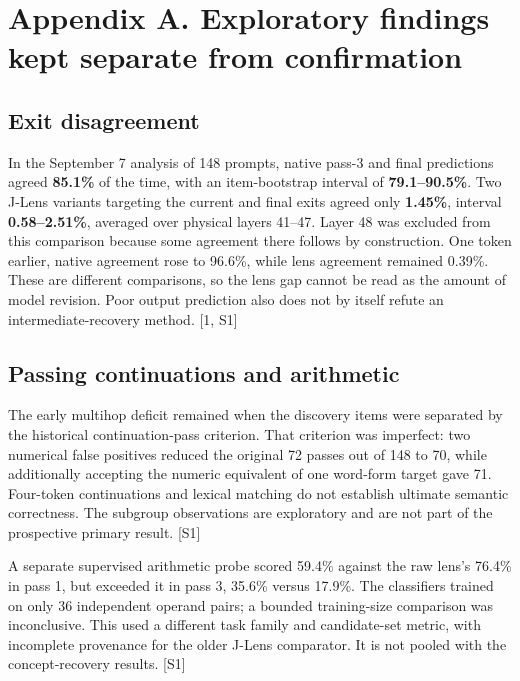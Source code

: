 \documentclass[
  11pt,
  a4paper,
]{article}
\begin{document}
\newpage

\section{Appendix A. Exploratory findings kept separate from
confirmation}\label{appendix-a.-exploratory-findings-kept-separate-from-confirmation}

\subsection{Exit disagreement}\label{exit-disagreement}

In the September 7 analysis of 148 prompts, native pass-3 and final
predictions agreed \textbf{85.1\%} of the time, with an item-bootstrap
interval of \textbf{79.1--90.5\%}. Two J-Lens variants targeting the
current and final exits agreed only \textbf{1.45\%}, interval
\textbf{0.58--2.51\%}, averaged over physical layers 41--47. Layer 48
was excluded from this comparison because some agreement there follows
by construction. One token earlier, native agreement rose to 96.6\%,
while lens agreement remained 0.39\%. These are different comparisons,
so the lens gap cannot be read as the amount of model revision. Poor
output prediction also does not by itself refute an
intermediate-recovery method. {[}1, S1{]}

\subsection{Passing continuations and
arithmetic}\label{passing-continuations-and-arithmetic}

The early multihop deficit remained when the discovery items were
separated by the historical continuation-pass criterion. That criterion
was imperfect: two numerical false positives reduced the original 72
passes out of 148 to 70, while additionally accepting the numeric
equivalent of one word-form target gave 71. Four-token continuations and
lexical matching do not establish ultimate semantic correctness. The
subgroup observations are exploratory and are not part of the
prospective primary result. {[}S1{]}

A separate supervised arithmetic probe scored 59.4\% against the raw
lens's 76.4\% in pass 1, but exceeded it in pass 3, 35.6\% versus
17.9\%. The classifiers trained on only 36 independent operand pairs; a
bounded training-size comparison was inconclusive. This used a different
task family and candidate-set metric, with incomplete provenance for the
older J-Lens comparator. It is not pooled with the concept-recovery
results. {[}S1{]}
\end{document}

